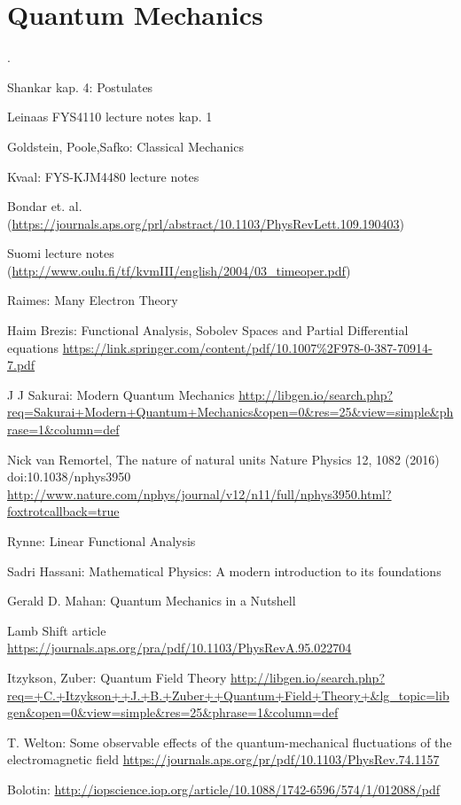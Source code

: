 \documentclass[a4paper]{article}
\title{}
\date{}
\author{}
\newcommand{\R}{\mathbb{R}}
\begin{document}
\renewcommand{\R}{{\bf R}}
\renewcommand{\r}{{\bf r}}
\newcommand{\p}{{\bf p}}
\newcommand{\q}{{\bf q}}
\renewcommand{\H}{\mathcal{H}}
\newcommand{\psit}{\left|\psi(t)\right\rangle}


\section{Quantum Mechanics}
.

Shankar kap. 4: Postulates

Leinaas FYS4110 lecture notes kap. 1

Goldstein, Poole,Safko: Classical Mechanics

Kvaal: FYS-KJM4480 lecture notes

Bondar et. al. (\url{https://journals.aps.org/prl/abstract/10.1103/PhysRevLett.109.190403})

Suomi lecture notes (\url{http://www.oulu.fi/tf/kvmIII/english/2004/03_timeoper.pdf})

Raimes: Many Electron Theory 

Haim Brezis: Functional Analysis, Sobolev Spaces and Partial Differential equations \url{https://link.springer.com/content/pdf/10.1007%2F978-0-387-70914-7.pdf}

J J Sakurai: Modern Quantum Mechanics \url{http://libgen.io/search.php?req=Sakurai+Modern+Quantum+Mechanics&open=0&res=25&view=simple&phrase=1&column=def}

Nick van Remortel, The nature of natural units Nature Physics 12, 1082 (2016) doi:10.1038/nphys3950 \url{http://www.nature.com/nphys/journal/v12/n11/full/nphys3950.html?foxtrotcallback=true}

Rynne: Linear Functional Analysis 

Sadri Hassani: Mathematical Physics: A modern introduction to its foundations

Gerald D. Mahan: Quantum Mechanics in a Nutshell

Lamb Shift article \url{https://journals.aps.org/pra/pdf/10.1103/PhysRevA.95.022704}

Itzykson, Zuber: Quantum Field Theory \url{http://libgen.io/search.php?req=+C.+Itzykson++J.+B.+Zuber++Quantum+Field+Theory+&lg_topic=libgen&open=0&view=simple&res=25&phrase=1&column=def}

T. Welton: Some observable effects of the quantum-mechanical fluctuations of the electromagnetic field \url{https://journals.aps.org/pr/pdf/10.1103/PhysRev.74.1157}

Bolotin: \url{http://iopscience.iop.org/article/10.1088/1742-6596/574/1/012088/pdf}
\end{document}
